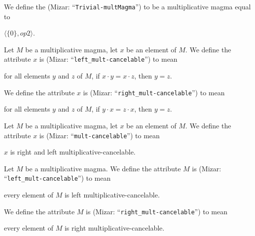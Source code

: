 \documentclass{article}
\begin{document}
\begin{definition}
We define the  (Mizar: ``\verb#Trivial-multMagma#'')
to be a multiplicative magma equal to
\begin{defn}
\item $\langle\{0\}, op2\rangle$.
\end{defn}
\end{definition}

\begin{definition}
Let $M$ be a multiplicative magma, let $x$ be an element of $M$.
We define the attribute $x$ is  (Mizar: ``\verb#left_mult-cancelable#'')
to mean
\begin{defn}%
\item for all elements $y$ and $z$ of $M$, if $x\cdot y=x\cdot z$,
  then $y=z$.
\end{defn}
We define the attribute $x$ is  (Mizar: ``\verb#right_mult-cancelable#'')
to mean
\begin{defn}%
\item for all elements $y$ and $z$ of $M$, if $y\cdot x=z\cdot x$,
  then $y=z$.
\end{defn}
\end{definition}

\begin{definition}
Let $M$ be a multiplicative magma, let $x$ be an element of $M$.
We define the attribute $x$ is  (Mizar: ``\verb#mult-cancelable#'')
to mean
\begin{defn}%
\item $x$ is right and left multiplicative-cancelable.
\end{defn}
\end{definition}

\begin{definition}%
Let $M$ be a multiplicative magma.
We define the attribute $M$ is  (Mizar: ``\verb#left_mult-cancelable#'')
to mean
\begin{defn}%
\item every element of $M$ is left multiplicative-cancelable.
\end{defn}
We define the attribute $M$ is  (Mizar: ``\verb#right_mult-cancelable#'')
to mean
\begin{defn}%
\item every element of $M$ is right multiplicative-cancelable.
\end{defn}
\end{definition}
\end{document}
